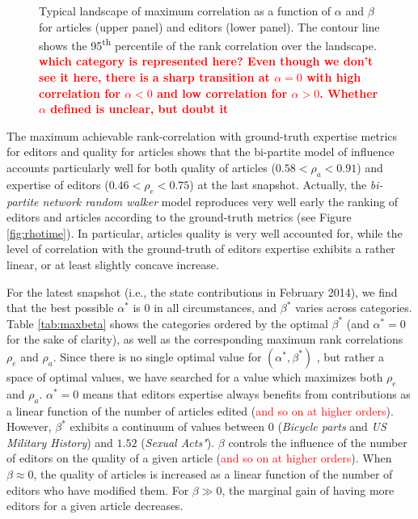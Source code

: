 \begin{figure}[!t]
\caption{Typical landscape of maximum correlation as a function of $\alpha$ and $\beta$ for articles (upper panel) and editors (lower panel). The contour line shows the 95\textsuperscript{th} percentile of the rank correlation over the landscape. \textcolor{red}{\bf which category is represented here? Even though we don't see it here, there is a sharp transition at $\alpha = 0$ with high correlation for $\alpha < 0$ and low correlation for $\alpha > 0$. Whether $\alpha$ defined is unclear, but doubt it}}
\label{fig:landscape}
\end{figure}

The maximum achievable rank-correlation with ground-truth expertise metrics for editors \cite{geiger2013} and quality for articles \cite{wang} shows that the bi-partite model of influence accounts particularly well for both quality of articles ($0.58 < \rho_a < 0.91$) and expertise of editors ($0.46 < \rho_e < 0.75 $) at the last snapshot. Actually, the {\it bi-partite network random walker} model reproduces very well early the ranking of editors and articles according to the ground-truth metrics (see Figure \ref{fig:rhotime}). In particular, articles quality is very well accounted for, while the level of correlation with the ground-truth of editors expertise exhibits a rather linear, or at least slightly concave increase.  


For the latest snapshot (i.e., the state contributions in February 2014), we find that the best possible $\alpha^*$ is $0$ in all circumstances, and $\beta^*$ varies across categories. Table \ref{tab:maxbeta} shows the categories ordered by the optimal $\beta^*$ (and $\alpha^*=0$ for the sake of clarity), as well as the corresponding maximum rank correlations $\rho_e$ and $\rho_a$. Since there is no single optimal value for $(\alpha^*,\beta^*)$ , but rather a space of optimal values, we have searched for a value which maximizes both $\rho_e$ and $\rho_a$. $\alpha^* = 0$ means that editors expertise always benefits from contributions as a linear function of the number of articles edited (\textcolor{red}{and so on at higher orders}).  However, $\beta^*$ exhibits a continuum of values between $0$ ({\it Bicycle parts} and {\it US Military History}) and $1.52$ ({\it Sexual Acts"}). $\beta$ controls the influence of the number of editors on the quality of a given article (\textcolor{red}{and so on at higher orders}). When $\beta \approx 0$, the quality of articles is increased as a linear function of the number of editors who have modified them. For $\beta \gg 0$, the marginal gain of having more editors for a given article decreases. 

